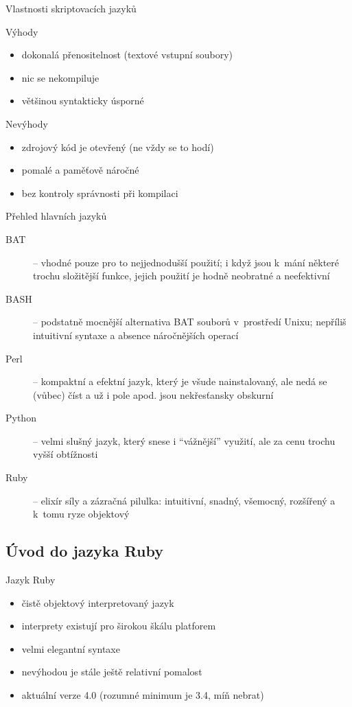 \documentclass{beamer}
\begin{document}
\begin{frame}{Vlastnosti skriptovacích jazyků}
  \begin{block}{Výhody}
    \begin{itemize}
      \item dokonalá přenositelnost (textové vstupní soubory)
      \item nic se nekompiluje
      \item většinou syntakticky úsporné
    \end{itemize}
  \end{block}
  \pause
  \begin{block}{Nevýhody}
    \begin{itemize}
      \item zdrojový kód je otevřený (ne vždy se to hodí)
      \item pomalé a paměťově náročné
      \item bez kontroly správnosti při kompilaci
    \end{itemize}
  \end{block}
\end{frame}

\begin{frame}{Přehled hlavních jazyků}
  \begin{description}
    \item[BAT] -- vhodné pouze pro to nejjednodušší použití; i když jsou k~mání některé trochu složitější funkce, jejich použití je hodně neobratné a neefektivní
    \item[BASH] -- podstatně mocnější alternativa BAT souborů v~prostředí Unixu; nepříliš intuitivní syntaxe a absence náročnějších operací
    \item[Perl] -- kompaktní a efektní jazyk, který je všude nainstalovaný, ale nedá se (vůbec) číst a už i pole apod. jsou nekřesťansky obskurní
    \item[Python] -- velmi slušný jazyk, který snese i ``vážnější'' využití, ale za cenu trochu vyšší obtížnosti
    \item[Ruby] -- elixír síly a zázračná pilulka: intuitivní, snadný, všemocný, rozšířený a k~tomu ryze objektový
  \end{description}
\end{frame}

\subsection{Úvod do jazyka Ruby}

\begin{frame}{Jazyk Ruby}
  \begin{itemize}
    \item čistě objektový interpretovaný jazyk
    \item interprety existují pro širokou škálu platforem
    \item velmi elegantní syntaxe
    \item nevýhodou je stále ještě relativní pomalost
    \item aktuální verze 4.0 (rozumné minimum je 3.4, míň nebrat)
  \end{itemize}
\end{frame}
\end{document}
